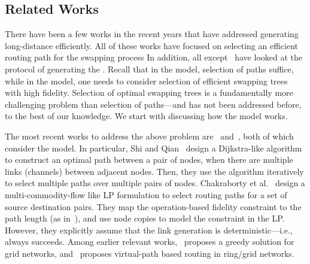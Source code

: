 \subsection{Related Works}
\label{sec:swapping_related}

There have been a few works in the recent years that have addressed generating long-distance \epss
efficiently. All of these works have focused on selecting an efficient routing path for the swapping
process 
In addition, all except~\cite{caleffi} have looked at the \os protocol of generating the
\epss. Recall that in the \os model, selection of paths suffice, while in the \wt model, one needs
to consider selection of efficient swapping trees with high fidelity.
Selection of optimal swapping trees is a fundamentally more challenging problem 
than selection of paths---and has not 
been addressed before, to the best of our knowledge.  We start with discussing how the \os model
works.

The most recent works to address the above problem are~\cite{sigcomm20} and~\cite{delft-lp}, 
both of which consider the \os model. 
In particular, Shi and Qian~\cite{sigcomm20} design a Dijkstra-like algorithm to construct an optimal path
between a pair of nodes, when there are multiple links (channels) between adjacent nodes. Then,
they use the algorithm iteratively to select multiple paths over multiple pairs of nodes.
Chakraborty et al.~\cite{delft-lp} design a multi-commodity-flow
like LP formulation to select routing paths for a set of source destination pairs. They map
the operation-based fidelity constraint to the path length (as in~\cite{BreigelEtAl1998}), and use
node copies to model the constraint in the LP. However, they explicitly assume that the link
\eps generation is deterministic---i.e., always succeeds. 
Among earlier relevant works,~\cite{guha} proposes a greedy solution
for grid networks, and~\cite{greedy2019distributed} proposes 
virtual-path based routing in ring/grid networks.

